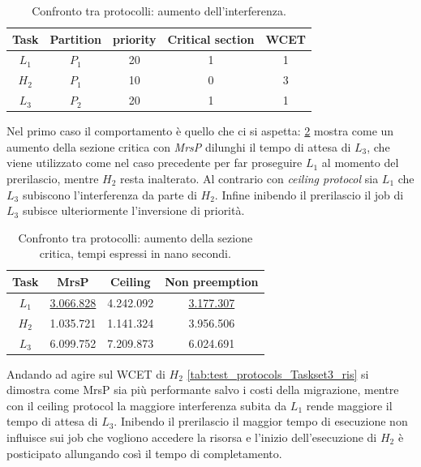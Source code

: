   \begin{table}
  \centering
  \begin{tabular}{ccccc}
  \hline\hline
    Task & Partition     & priority & Critical section & WCET  \\ \hline
    $L_1$ & $P_1$  & 20 & 1 & 1 \\
    $H_2$ & $P_1$  & 10 & 0 & 3 \\
    $L_3$ & $P_2$  & 20 & 1 & 1 \\
    \hline
    \end{tabular}
    \caption{Confronto tra protocolli: aumento dell'interferenza.}
  \label{tab:test_protocols_Taskset3}
  \end{table}

\noindent Nel primo caso il comportamento è quello che ci si aspetta: \ref{tab:test_protocols_Taskset2_ris} mostra come un aumento della sezione critica con \textit{MrsP} dilunghi il tempo di attesa di $L_3$, che viene utilizzato come nel caso precedente per far proseguire $L_1$ al momento del prerilascio, mentre $H_2$ resta inalterato. Al contrario con \textit{ceiling protocol} sia $L_1$ che $L_3$ subiscono l'interferenza da parte di $H_2$. Infine inibendo il prerilascio il job di $L_3$ subisce ulteriormente l'inversione di priorità.\\

\begin{table}
  \centering
  \begin{tabular}{cccc}
  \hline\hline
    Task & MrsP & Ceiling & Non preemption \\ \hline
    $L_1$ & \underline{3.066.828} & 4.242.092 & \underline{3.177.307} \\
    $H_2$ & 1.035.721 & 1.141.324 & 3.956.506 \\
    $L_3$ & 6.099.752 & 7.209.873 & 6.024.691 \\
    \hline
    \end{tabular}
    \caption{Confronto tra protocolli: aumento della sezione critica, tempi espressi in nano secondi.}
  \label{tab:test_protocols_Taskset2_ris}
  \end{table}

\noindent Andando ad agire sul WCET di $H_2$ \ref{tab:test_protocols_Taskset3_ris} si dimostra come MrsP sia più performante salvo i costi della migrazione, mentre con il ceiling protocol la maggiore interferenza subita da $L_1$ rende maggiore il tempo di attesa di $L_3$. Inibendo il prerilascio il maggior tempo di esecuzione non influisce sui job che vogliono accedere la risorsa e l'inizio dell'esecuzione di $H_2$ è posticipato allungando così il tempo di completamento.\\

